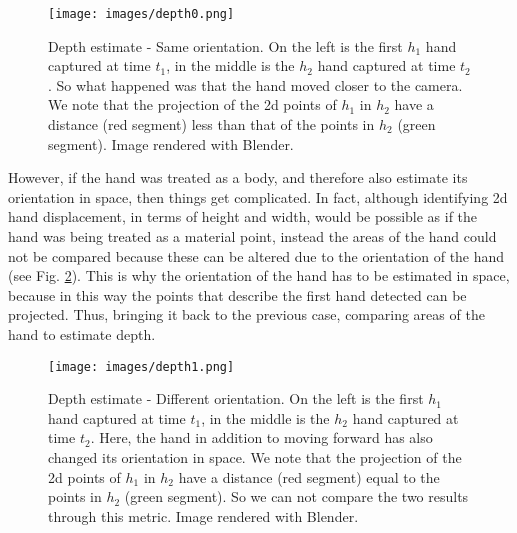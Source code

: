 \begin{figure}[H]
	\centering
	\texttt{[image: images/depth0.png]}
	\caption[Depth estimate - Same orientation.]{Depth estimate - Same orientation. On the left is the first $h_1$ hand captured at time $t_1$, in the middle is the $h_2$ hand captured at time $t_2$. So what happened was that the hand moved closer to the camera. We note that the projection of the \gls{2d} points of $h_1$ in $h_2$ have a distance (red segment) less than that of the points in $h_2$ (green segment). Image rendered with Blender.}
	\label{fig:sameorientation}
\end{figure}

\noindent However, if the hand was treated as a body, and therefore also estimate its orientation in space, then things get complicated. In fact, although identifying \gls{2d} hand displacement, in terms of height and width, would be possible as if the hand was being treated as a material point, instead the areas of the hand could not be compared because these can be altered due to the orientation of the hand (see Fig. \ref{fig:difforientation}). This is why the orientation of the hand has to be estimated in space, because in this way the points that describe the first hand detected can be projected. Thus, bringing it back to the previous case, comparing areas of the hand to estimate depth. \\

\begin{figure}
	\centering
	\texttt{[image: images/depth1.png]}
	\caption[Depth estimate - Different orientation.]{Depth estimate - Different orientation. On the left is the first $h_1$ hand captured at time $t_1$, in the middle is the $h_2$ hand captured at time $t_2$. Here, the hand in addition to moving forward has also changed its orientation in space. We note that the projection of the \gls{2d} points of $h_1$ in $h_2$ have a distance (red segment) equal to the points in $h_2$ (green segment). So we can not compare the two results through this metric. Image rendered with Blender.}
	\label{fig:difforientation}
\end{figure}


